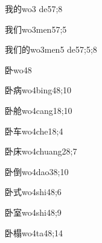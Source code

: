 \begin{verbete}{我的}{wo3 de5}{7;8}
\end{verbete}

\begin{verbete}{我们}{wo3men5}{7;5}
\end{verbete}

\begin{verbete}{我们的}{wo3men5 de5}{7;5;8}
\end{verbete}

\begin{verbete}{卧}{wo4}{8}
\end{verbete}

\begin{verbete}{卧病}{wo4bing4}{8;10}
\end{verbete}

\begin{verbete}{卧舱}{wo4cang1}{8;10}
\end{verbete}

\begin{verbete}{卧车}{wo4che1}{8;4}
\end{verbete}

\begin{verbete}{卧床}{wo4chuang2}{8;7}
\end{verbete}

\begin{verbete}{卧倒}{wo4dao3}{8;10}
\end{verbete}

\begin{verbete}{卧式}{wo4shi4}{8;6}
\end{verbete}

\begin{verbete}{卧室}{wo4shi4}{8;9}
\end{verbete}

\begin{verbete}{卧榻}{wo4ta4}{8;14}
\end{verbete}

